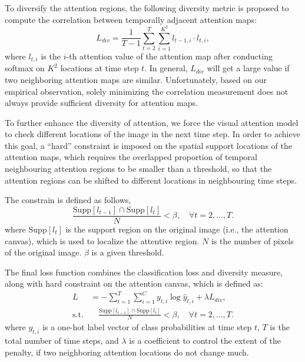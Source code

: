 \documentclass[journal]{IEEEtran}
\begin{document}
To diversify the attention regions, the following diversity metric is proposed to compute the correlation between temporally adjacent attention maps:
\begin{equation}
  \label{eq:latt}
  L_\textit{div} = \frac{1}{T-1}\sum_{t=2}^T\sum_{i=1}^{K^2}l_{t-1,i} \cdot l_{t,i},
\end{equation}
where $l_{t,i}$ is the $i$-th attention value of the attention map after conducting softmax on $K^2$ locations at time step $t$. In general, $L_\textit{div}$ will get a large value if two neighboring attention maps are similar. Unfortunately, based on our empirical observation, solely minimizing the correlation measurement does not always provide sufficient diversity for attention maps.

To further enhance the diversity of attention, we force the visual attention model to check different locations of the image in the next time step. In order to achieve this goal, a ``hard'' constraint is imposed on the spatial support locations of the attention maps, which requires the overlapped proportion of temporal neighbouring attention regions to be smaller than a threshold, so that the attention regions can be shifted to different locations in neighbouring time steps.

The constrain is defined as follows,
\begin{equation}
\label{eq:supp}
\frac{\mathrm{Supp}[l_{t-1}] \cap \mathrm{Supp}[l_{t}]}{N} < \beta,\quad \forall t = 2,\ldots, T.
\end{equation}
where $\mathrm{Supp}[l_t]$ is the support region on the original image (i.e., the attention canvas), which is used to localize the attentive region. $N$ is the number of pixels of the original image. $\beta$ is a given threshold.

The final loss function combines the classification loss and diversity measure, along with hard constraint on the attention canvas, which is defined as:
\begin{align}
  L &=-\sum_{t=1}^T\sum_{i=1}^{C}y_{t,i}\log\hat{y}_{t,i} + \lambda L_{\textit{div}}, \label{eq:lambda}\\
  \text{s.t.} & \quad \frac{\mathrm{Supp}[l_{t-1}] \cap \mathrm{Supp}[l_{t}]}{N} < \beta,\quad \forall t = 2,\ldots, T. \nonumber
\end{align}
where $y_{t,i}$ is a one-hot label vector of class probabilities at time step $t$, $T$ is the total number of time steps, and $\lambda$ is a coefficient to control the extent of the penalty, if two neighboring attention locations do not change much.
\end{document}
